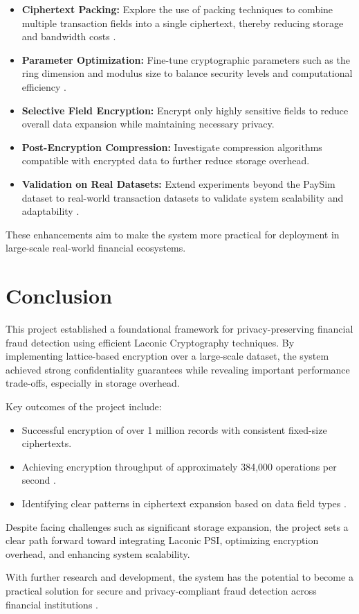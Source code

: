 \begin{itemize}
    \item \textbf{Ciphertext Packing:} Explore the use of packing techniques to combine multiple transaction fields into a single ciphertext, thereby reducing storage and bandwidth costs \cite{begum2023secure}.
    \item \textbf{Parameter Optimization:} Fine-tune cryptographic parameters such as the ring dimension and modulus size to balance security levels and computational efficiency \cite{zhao2025vlwe}.
    \item \textbf{Selective Field Encryption:} Encrypt only highly sensitive fields to reduce overall data expansion while maintaining necessary privacy.
    \item \textbf{Post-Encryption Compression:} Investigate compression algorithms compatible with encrypted data to further reduce storage overhead.
    \item \textbf{Validation on Real Datasets:} Extend experiments beyond the PaySim dataset to real-world transaction datasets to validate system scalability and adaptability \cite{cryptoeprint:2023/404}.
\end{itemize}

These enhancements aim to make the system more practical for deployment in large-scale real-world financial ecosystems.

\section{Conclusion}

This project established a foundational framework for privacy-preserving financial fraud detection using efficient Laconic Cryptography techniques.  
By implementing lattice-based encryption over a large-scale dataset, the system achieved strong confidentiality guarantees while revealing important performance trade-offs, especially in storage overhead.

Key outcomes of the project include:

\begin{itemize}
    \item Successful encryption of over 1 million records with consistent fixed-size ciphertexts.
    \item Achieving encryption throughput of approximately 384,000 operations per second \cite{zhao2025vlwe}.
    \item Identifying clear patterns in ciphertext expansion based on data field types \cite{cryptoeprint:2023/404}.
\end{itemize}

Despite facing challenges such as significant storage expansion, the project sets a clear path forward toward integrating Laconic PSI, optimizing encryption overhead, and enhancing system scalability.

With further research and development, the system has the potential to become a practical solution for secure and privacy-compliant fraud detection across financial institutions \cite{cryptoeprint:2023/404}.

\clearpage
